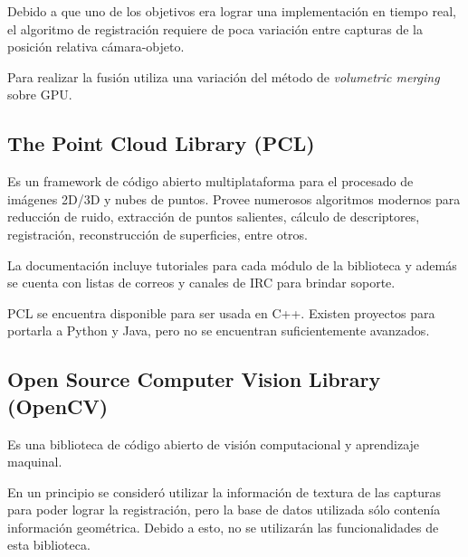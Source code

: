 			Debido a que uno de los objetivos era lograr
			una implementación en tiempo real,
			el algoritmo de registración requiere de
			poca variación entre capturas de
			la posición relativa cámara-objeto.

			Para realizar la fusión utiliza una variación del método de
			\emph{volumetric merging} sobre GPU.\cite{Izadi:2011:KRR:2047196.2047270}

		\subsection{The Point Cloud Library (PCL)}

			Es un framework de código abierto multiplataforma para el procesado de imágenes 2D/3D y nubes de puntos.
			Provee numerosos algoritmos modernos
			para reducción de ruido, extracción de puntos salientes,
			cálculo de descriptores, registración,
			reconstrucción de superficies, entre otros.

			La documentación incluye tutoriales para cada módulo de la biblioteca
			y además se cuenta con listas de correos
			y canales de IRC para brindar soporte.


			PCL se encuentra disponible para ser usada en C++.
			Existen proyectos para portarla a Python y Java,
			pero no se encuentran suficientemente avanzados.

		\subsection{Open Source Computer Vision Library (OpenCV)}
			Es una biblioteca de código abierto de
			visión computacional y aprendizaje maquinal.

			En un principio se consideró utilizar la información de textura de
			las capturas para poder lograr la registración, pero la base de
			datos utilizada sólo contenía información geométrica.
			Debido a esto, no se utilizarán las funcionalidades de esta biblioteca.


